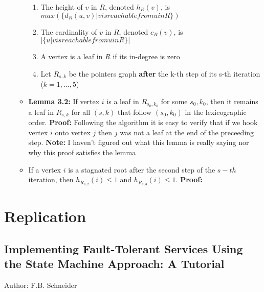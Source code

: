 \documentclass[a4paper]{article}
\begin{document}
\begin{itemize}
\begin{itemize}
\begin{enumerate}
\item The height of $v$ in $R$, denoted $h_R(v)$, is $max(\{ d_R(u, v) | v is reachable from u in R \})$

\item The cardinality of $v$ in $R$, denoted $c_R(v)$, is $|\{u | v is reachable from u in R \}|$

\item A vertex is a leaf in $R$ if its in-degree is zero

\item Let $R_{s, k}$ be the pointers graph \textbf{after} the k-th step of its s-th iteration ($k = 1,\ldots, 5$)
\end{enumerate} 

\item \textbf{Lemma 3.2:} If vertex $i$ is a leaf in $R_{s_0, k_0}$ for some $s_0, k_0$, then it remains a leaf in $R_{s,k}$ for all $(s, k)$ that follow $(s_0, k_0)$ in the lexicographic order. \textbf{Proof:} Following the algorithm it is easy to verify that if we hook vertex $i$ onto vertex $j$ then $j$ was not a leaf at the end of the preceeding step. \textbf{Note:} I haven't figured out what this lemma is really saying nor why this proof satisfies the lemma

\item If a vertex $i$ is a stagnated root after the second step of the $s-th$ iteration, then $h_{R_{s, 2}}(i) \leq 1$ and $h_{R_{s, 3}}(i) \leq 1$. \textbf{Proof:} 

\end{itemize}

\end{itemize}








\section{Replication}

\subsection{Implementing Fault-Tolerant Services Using the State Machine Approach: A Tutorial}

Author: F.B. Schneider
\end{document}
